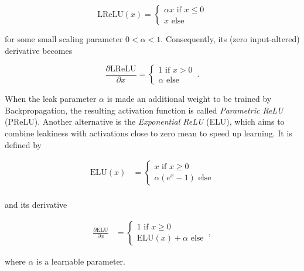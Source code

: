 \[  \text{LReLU}(x) = \begin{cases}
			\alpha x \text{ if } x \leq 0\\
			x \text{ else}
		 \end{cases}
\]

\noindent for some small scaling parameter $0 < \alpha < 1$. Consequently, its (zero input-altered) derivative becomes

\[ \frac{\partial \text{LReLU}}{\partial x} = \begin{cases}
							1 \text { if } x > 0\\
							\alpha \text{ else}
						        \end{cases} \,.
\]

\noindent When the leak parameter $\alpha$ is made an additional weight to be trained by Backpropagation, the resulting activation function is called \textit{Parametric ReLU} (PReLU). \cite{rectifiers} Another alternative is the \textit{Exponential ReLU} (ELU), \cite{elu} which aims to combine leakiness with activations close to zero mean to speed up learning. It is defined by

\begin {align}
	\text{ELU}(x) &= \begin{cases}
			x \text { if } x \geq 0\\
			\alpha(e^x - 1) \text{ else}
		     \end{cases}\\
\end {align}

and its derivative 

\begin {align}
	\frac{\partial \text{ELU}}{\partial x} &= \begin{cases}
								1 \text { if } x \geq 0\\
								\text{ELU}(x) + \alpha \text{ else}
		    				     \end{cases} \,,
\end {align}

\noindent where $\alpha$ is a learnable parameter.


